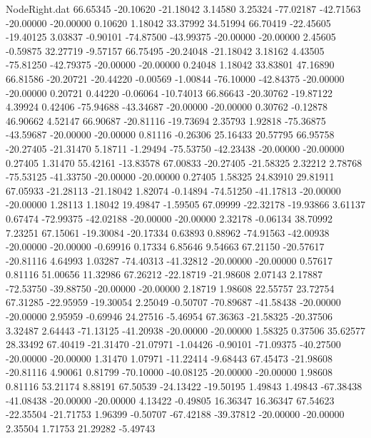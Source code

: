 \begin{filecontents}{NodeRight.dat}
  66.65345  -20.10620  -21.18042     3.14580    3.25324  -77.02187  -42.71563  -20.00000  -20.00000    0.10620    1.18042   33.37992   34.51994
  66.70419  -22.45605  -19.40125     3.03837   -0.90101  -74.87500  -43.99375  -20.00000  -20.00000    2.45605   -0.59875   32.27719   -9.57157
  66.75495  -20.24048  -21.18042     3.18162    4.43505  -75.81250  -42.79375  -20.00000  -20.00000    0.24048    1.18042   33.83801   47.16890
  66.81586  -20.20721  -20.44220    -0.00569   -1.00844  -76.10000  -42.84375  -20.00000  -20.00000    0.20721    0.44220   -0.06064  -10.74013
  66.86643  -20.30762  -19.87122     4.39924    0.42406  -75.94688  -43.34687  -20.00000  -20.00000    0.30762   -0.12878   46.90662    4.52147
  66.90687  -20.81116  -19.73694     2.35793    1.92818  -75.36875  -43.59687  -20.00000  -20.00000    0.81116   -0.26306   25.16433   20.57795
  66.95758  -20.27405  -21.31470     5.18711   -1.29494  -75.53750  -42.23438  -20.00000  -20.00000    0.27405    1.31470   55.42161  -13.83578
  67.00833  -20.27405  -21.58325     2.32212    2.78768  -75.53125  -41.33750  -20.00000  -20.00000    0.27405    1.58325   24.83910   29.81911
  67.05933  -21.28113  -21.18042     1.82074   -0.14894  -74.51250  -41.17813  -20.00000  -20.00000    1.28113    1.18042   19.49847   -1.59505
  67.09999  -22.32178  -19.93866     3.61137    0.67474  -72.99375  -42.02188  -20.00000  -20.00000    2.32178   -0.06134   38.70992    7.23251
  67.15061  -19.30084  -20.17334     0.63893    0.88962  -74.91563  -42.00938  -20.00000  -20.00000   -0.69916    0.17334    6.85646    9.54663
  67.21150  -20.57617  -20.81116     4.64993    1.03287  -74.40313  -41.32812  -20.00000  -20.00000    0.57617    0.81116   51.00656   11.32986
  67.26212  -22.18719  -21.98608     2.07143    2.17887  -72.53750  -39.88750  -20.00000  -20.00000    2.18719    1.98608   22.55757   23.72754
  67.31285  -22.95959  -19.30054     2.25049   -0.50707  -70.89687  -41.58438  -20.00000  -20.00000    2.95959   -0.69946   24.27516   -5.46954
  67.36363  -21.58325  -20.37506     3.32487    2.64443  -71.13125  -41.20938  -20.00000  -20.00000    1.58325    0.37506   35.62577   28.33492
  67.40419  -21.31470  -21.07971    -1.04426   -0.90101  -71.09375  -40.27500  -20.00000  -20.00000    1.31470    1.07971  -11.22414   -9.68443
  67.45473  -21.98608  -20.81116     4.90061    0.81799  -70.10000  -40.08125  -20.00000  -20.00000    1.98608    0.81116   53.21174    8.88191
  67.50539  -24.13422  -19.50195     1.49843    1.49843  -67.38438  -41.08438  -20.00000  -20.00000    4.13422   -0.49805   16.36347   16.36347
  67.54623  -22.35504  -21.71753     1.96399   -0.50707  -67.42188  -39.37812  -20.00000  -20.00000    2.35504    1.71753   21.29282   -5.49743

\end{filecontents}
